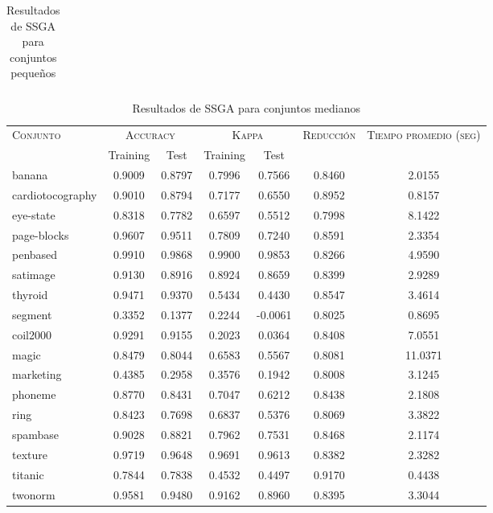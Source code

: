 \begin{table}[]
\begin{tabular}{l c c c c c c}
\hline
\end{tabular}
\caption{Resultados de SSGA para conjuntos pequeños }
\label{res-peq-ssga}
\end{table}


\begin{table}[]
\centering
\begin{tabular}{l c c c c c c}
\hline
\multirow{2}{*}{\textsc{Conjunto}}
	& \multicolumn{2}{c}{\textsc{Accuracy}}
	& \multicolumn{2}{c}{\textsc{Kappa}}
	& \textsc{Reducción}
	& \textsc{Tiempo promedio (seg)} \\
	& Training & Test
	& Training & Test \\ 
\hline
\hline

banana & 0.9009 & 0.8797 & 0.7996 & 0.7566 & 0.8460 & 2.0155 \\
cardiotocography & 0.9010 & 0.8794 & 0.7177 & 0.6550 & 0.8952 & 0.8157 \\
eye-state & 0.8318 & 0.7782 & 0.6597 & 0.5512 & 0.7998 & 8.1422 \\
page-blocks & 0.9607 & 0.9511 & 0.7809 & 0.7240 & 0.8591 & 2.3354 \\
penbased & 0.9910 & 0.9868 & 0.9900 & 0.9853 & 0.8266 & 4.9590 \\
satimage & 0.9130 & 0.8916 & 0.8924 & 0.8659 & 0.8399 & 2.9289 \\
thyroid & 0.9471 & 0.9370 & 0.5434 & 0.4430 & 0.8547 & 3.4614 \\
segment & 0.3352 & 0.1377 & 0.2244 & -0.0061 & 0.8025 & 0.8695 \\
coil2000 & 0.9291 & 0.9155 & 0.2023 & 0.0364 & 0.8408 & 7.0551 \\
magic & 0.8479 & 0.8044 & 0.6583 & 0.5567 & 0.8081 & 11.0371 \\ 
marketing & 0.4385 & 0.2958 & 0.3576 & 0.1942 & 0.8008 & 3.1245 \\
phoneme & 0.8770 & 0.8431 & 0.7047 & 0.6212 & 0.8438 & 2.1808 \\
ring & 0.8423 & 0.7698 & 0.6837 & 0.5376 & 0.8069 & 3.3822 \\
spambase & 0.9028 & 0.8821 & 0.7962 & 0.7531 & 0.8468 & 2.1174 \\
texture & 0.9719 & 0.9648 & 0.9691 & 0.9613 & 0.8382 & 2.3282 \\
titanic & 0.7844 & 0.7838 & 0.4532 & 0.4497 & 0.9170 & 0.4438 \\
twonorm & 0.9581 & 0.9480 & 0.9162 & 0.8960 & 0.8395 & 3.3044 \\

\hline
\end{tabular}
\caption{Resultados de SSGA para conjuntos medianos }
\label{res-med-ssga}
\end{table}


